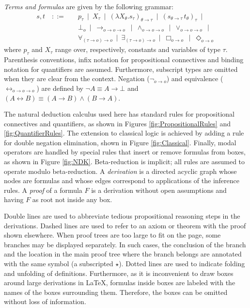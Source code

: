 \documentclass[smallextended]{svjour3}
\newcommand{\imp}{\rightarrow}
\newcommand{\biimp}{\leftrightarrow}
\newcommand{\all}{\forall}
\newcommand{\ex}{\exists}
\newcommand{\nec}{\Box} %
\newcommand{\pos}{\Diamond} %
\begin{document}
\begin{definition} \emph{Terms and formulas} are given by the following grammar:
\begin{align*}
 s,t \quad ::= \quad & 
  p_\tau \ \mid \ 
  X_\tau \ \mid \
  (\lambda X_\theta.s_\tau)_{\theta\imp\tau} \ \mid \ 
  (s_{\theta\imp\tau}\, t_\theta)_\tau \ \mid \\
& \bot_o \ \mid \
  \imp_{o\imp o\imp o} \ \mid \ 
  \wedge_{o\imp o\imp o} \ \mid \
  \vee_{o\imp o\imp o} \ \mid \\
& \all_{(\tau\imp o)\imp o} \ \mid \ 
  \ex_{(\tau\imp o)\imp o} \ \mid \
  \nec_{o\imp o} \ \mid \
  \pos_{o\imp o}
\end{align*}
where $p_\tau$ and $X_\tau$ range over, respectively, constants and variables of type $\tau$. Parenthesis conventions, infix notation for propositional connectives and binding notation for quantifiers are assumed. Furthermore, subscript types are omitted when they are clear from the context. Negation ($\neg_{o\imp o}$) and equivalence ($\biimp_{o\imp o\imp o}$) are defined by $\neg A\equiv A\imp \bot$ and $ (A\biimp B)\equiv (A\imp B)\wedge (B\imp A)$.
\end{definition}

The natural deduction calculus used here has standard rules for propositional connectives and quantifiers, as shown in Figures \ref{fig:PropositionalRules} and \ref{fig:QuantifierRules}. The extension to classical logic is achieved by adding a rule for double negation elimination, shown in Figure \ref{fig:Classical}. Finally, modal operators are handled by special rules that insert or remove formulas from boxes, as shown in Figure \ref{fig:NDK}.
Beta-reduction is implicit; all rules are assumed to operate modulo beta-reduction. A \emph{derivation} is a directed acyclic graph whose nodes are formulas and whose edges correspond to applications of the inference rules. A \emph{proof} of a formula $F$ is a derivation without open assumptions and having $F$ as root not inside any box. 

\newcommand{\subproof}{\star}

Double lines are used to abbreviate tedious propositional reasoning steps in the derivations. Dashed lines are used to refer to an axiom or theorem with the proof shown elsewhere. When proof trees are too large to fit on the page, some branches may be displayed separately. In such cases, the conclusion of the branch and the location in the main proof tree where the branch belongs are annotated with the same symbol (a subscripted $\subproof$). Dotted lines are used to indicate folding and unfolding of definitions. Furthermore, as it is inconvenient to draw boxes around large derivations in \LaTeX, formulas inside boxes are labeled with the names of the boxes surrounding them. Therefore, the boxes can be omitted without loss of information. 
\end{document}
